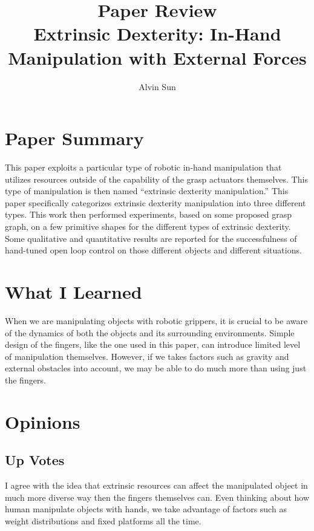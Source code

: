 \documentclass[10pt, twocolumn]{article}
\title{Paper Review\\Extrinsic Dexterity: In-Hand Manipulation with External Forces}
\author{Alvin Sun}
\begin{document}
\maketitle

\section{Paper Summary}
This paper exploits a particular type of robotic in-hand manipulation that utilizes
resources outside of the capability of the grasp actuators themselves. This
type of manipulation is then named ``extrinsic dexterity manipulation.'' This
paper specifically categorizes extrinsic dexterity manipulation into three
different types. This work then performed experiments, based on some proposed
grasp graph, on a few primitive shapes
for the different types of extrinsic dexterity. Some qualitative and quantitative
results are reported for the successfulness of hand-tuned open loop control
on those different objects and different situations.

\section{What I Learned}
When we are manipulating objects with robotic grippers, it is crucial to be
aware of the dynamics of both the objects and its surrounding environments.
Simple design of the fingers, like the one used in this paper, can introduce
limited level of manipulation themselves. However, if we takes factors such as
gravity and external obstacles into account, we may be able to do much more than
using just the fingers.

\section{Opinions}

\subsection{Up Votes}
I agree with the idea that extrinsic resources can affect the manipulated object
in much more diverse way then the fingers themselves can. Even thinking about how
human manipulate objects with hands, we take advantage of factors such as weight
distributions and fixed platforms all the time.
\end{document}
